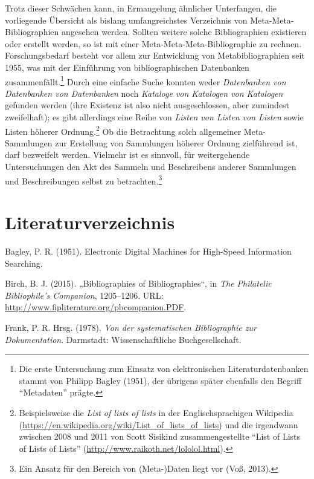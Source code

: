 \documentclass[a4paper,
fontsize=11pt,
oneside,
numbers=noperiodatend,
parskip=half-,
bibliography=totoc,
final
]{scrartcl}
\begin{document}
Trotz dieser Schwächen kann, in Ermangelung ähnlicher Unterfangen, die
vorliegende Übersicht als bislang umfangreichstes Verzeichnis von
Meta-Meta- Bibliographien angesehen werden. Sollten weitere solche
Bibliographien existieren oder erstellt werden, so ist mit einer
Meta-Meta-Meta-Bibliographie zu rechnen. Forschungsbedarf besteht vor
allem zur Entwicklung von Metabibliographien seit 1955, was mit der
Einführung von bibliographischen Datenbanken zusammenfällt.\footnote{Die
  erste Untersuchung zum Einsatz von elektronischen Literaturdatenbanken
  stammt von Philipp Bagley (1951), der übrigens später ebenfalls den
  Begriff \enquote{Metadaten} prägte.} Durch eine einfache Suche konnten
weder \emph{Datenbanken von Datenbanken von Datenbanken} noch
\emph{Kataloge von Katalogen von Katalogen} gefunden werden (ihre
Existenz ist also nicht ausgeschlossen, aber zumindest zweifelhaft); es
gibt allerdings eine Reihe von \emph{Listen von Listen von Listen} sowie
Listen höherer Ordnung.\footnote{Beispielsweise die \emph{List of lists
  of lists} in der Englischsprachigen Wikipedia
  (\url{https://en.wikipedia.org/wiki/List_of_lists_of_lists}) und die
  irgendwann zwischen 2008 und 2011 von Scott Sisikind zusammengestellte
  \enquote{List of Lists of Lists of Lists}
  (\url{http://www.raikoth.net/lololol.html}).} Ob die Betrachtung solch
allgemeiner Meta-Sammlungen zur Erstellung von Sammlungen höherer
Ordnung zielführend ist, darf bezweifelt werden. Vielmehr ist es sinnvoll,
für weitergehende Untersuchungen den Akt des Sammeln und Beschreibens
anderer Sammlungen und Beschreibungen selbst zu betrachten.\footnote{Ein
  Ansatz für den Bereich von (Meta-)Daten liegt vor (Voß, 2013).}

\section*{Literaturverzeichnis}\label{literaturverzeichnis}

Bagley, P. R. (1951). Electronic Digital Machines for High-Speed
Information Searching.

Birch, B. J. (2015). „Bibliographies of Bibliographies``, in \emph{The
Philatelic Bibliophile's Companion}, 1205--1206. URL:
\url{http://www.fipliterature.org/pbcompanion.PDF}.

Frank, P. R. Hrsg. (1978). \emph{Von der systematischen Bibliographie
zur Dokumentation}. Darmstadt: Wissenschaftliche Buchgesellschaft.
\end{document}
